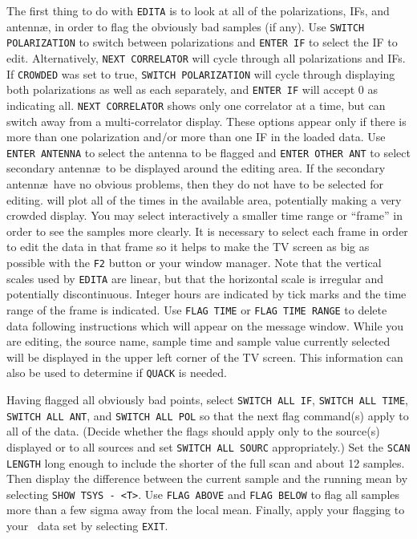 The first thing to do with {\tt EDITA} is to look at all of the
polarizations, IFs, and antenn\ae, in order to flag the obviously bad
samples (if any).  Use {\tt SWITCH POLARIZATION} to switch between
polarizations and {\tt ENTER IF} to select the IF to edit.
Alternatively, {\tt NEXT CORRELATOR} will cycle through all
polarizations and IFs.  If {\tt CROWDED} was set to true, {\tt SWITCH
POLARIZATION} will cycle through displaying both polarizations as well
as each separately, and {\tt ENTER IF} will accept 0 as indicating
all.  {\tt NEXT CORRELATOR} shows only one correlator at a time, but
can switch away from a multi-correlator display.  These options appear
only if there is more than one polarization and/or more than one IF in
the loaded data.  Use {\tt ENTER ANTENNA} to select the antenna to be
flagged and {\tt ENTER OTHER ANT} to select secondary antenn\ae\ to
be displayed around the editing area.  If the secondary antenn\ae\
have no obvious problems, then they do not have to be selected for
editing.  {\tt \Tndx{EDITA}} will plot all of the times in the
available area, potentially making a very crowded display.  You may
select interactively a smaller time range or ``frame'' in order to see
the samples more clearly.  It is necessary to select each frame in
order to edit the data in that frame so it helps to make the TV screen
as big as possible with the {\tt F2} button or your window manager.
Note that the vertical scales used by {\tt EDITA} are linear, but that
the horizontal scale is irregular and potentially discontinuous.
Integer hours are indicated by tick marks and the time range of the
frame is indicated.  Use {\tt FLAG TIME} or {\tt FLAG TIME RANGE} to
delete data following instructions which will appear on the message
window.  While you are editing, the source name, sample time and
sample value currently selected will be displayed in the upper left
corner of the TV screen.  This information can also be used to
determine if {\tt QUACK} is needed.

Having flagged all obviously bad points, select {\tt SWITCH ALL IF},
{\tt SWITCH ALL TIME}, {\tt SWITCH ALL ANT}, and {\tt SWITCH ALL POL}
so that the next flag command(s) apply to all of the data.  (Decide
whether the flags should apply only to the source(s) displayed or to
all sources and set {\tt SWITCH ALL SOURC} appropriately.)  Set the
{\tt SCAN LENGTH} long enough to include the shorter of the full scan
and about 12 samples.  Then display the difference between the current
sample and the running mean by selecting \hbox{{\tt SHOW TSYS - <T>}}.
Use {\tt FLAG ABOVE} and {\tt FLAG BELOW} to flag all samples more
than a few sigma away from the local mean.  Finally, apply your
flagging to your \uv\ data set by selecting \hbox{{\tt EXIT}}.

